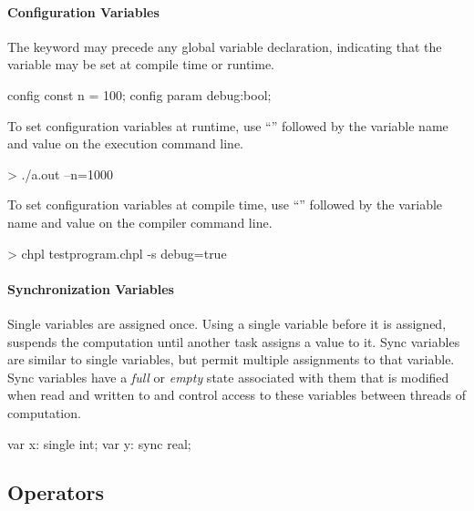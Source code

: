 \paragraph{Configuration Variables}
The keyword  may precede any global variable
declaration, indicating that the variable may be set at
compile time or runtime.
\begin{chapel}
config const n = 100;
config param debug:bool;
\end{chapel}
To set configuration variables at runtime, use ``\chpl{--}''
followed by the variable name and value on the execution
command line.
\begin{commandline}
> ./a.out --n=1000
\end{commandline}
To set configuration variables at compile time, use
``'' followed by the variable name and value on the
compiler command line.
\begin{commandline}
> chpl testprogram.chpl -s debug=true
\end{commandline}

\paragraph{Synchronization Variables}
Single variables are assigned once.  Using a single variable
before it is assigned, suspends the computation until another
task assigns a value to it.
Sync variables are similar to single variables,
but permit multiple assignments to that variable. Sync
variables have a {\em full} or {\em empty} state associated
with them that is modified when read and written to and control
access to these variables between threads of computation.
\begin{chapel}
var x: single int;
var y: sync real;
\end{chapel}

\subsection{Operators}
